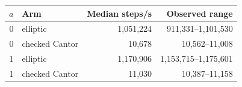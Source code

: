 \begin{tabular}{rlrr}\toprule
$a$ & Arm & Median steps/s & Observed range\\\midrule
0 & elliptic & 1,051,224 & 911,331--1,101,530 \\
0 & checked Cantor & 10,678 & 10,562--11,008 \\
1 & elliptic & 1,170,906 & 1,153,715--1,175,601 \\
1 & checked Cantor & 11,030 & 10,387--11,158 \\
\bottomrule\end{tabular}
